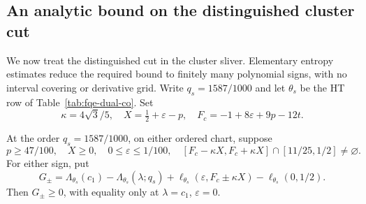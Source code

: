\subsection{An analytic bound on the distinguished cluster cut}\label{sec:sup-sliver}
We now treat the distinguished cut in the cluster sliver. Elementary entropy estimates reduce the
required bound to finitely many polynomial signs, with no interval covering or derivative grid.
Write $q_s=1587/1000$ and let $\theta_s$ be the
HT row of Table~\ref{tab:fqe-dual-co}. Set
\[
\kappa=4\sqrt3/5,\quad X=\tfrac12+\varepsilon-p,\quad
F_c=-1+8\varepsilon+9p-12t.
\]
\begin{lemma}
\label{lem:fqe-cluster-sliver}
At the order $q_s=1587/1000$,
on either ordered chart, suppose
\[
p\ge47/100,\quad X\ge0,\quad 0\le\varepsilon\le1/100,\quad
[F_c-\kappa X,F_c+\kappa X]\cap[11/25,1/2]\ne\varnothing.
\]
For either sign, put
\[
G_{\pm}=\Lambda_{\theta_s}(c_1)-\Lambda_{\theta_s}(\lambda;q_s)
+\ell_{\theta_s}(\varepsilon,F_c\pm\kappa X)
-\ell_{\theta_s}(0,1/2).
\]
Then $G_{\pm}\ge0$, with equality only at
$\lambda=c_1$, $\varepsilon=0$.
\end{lemma}

